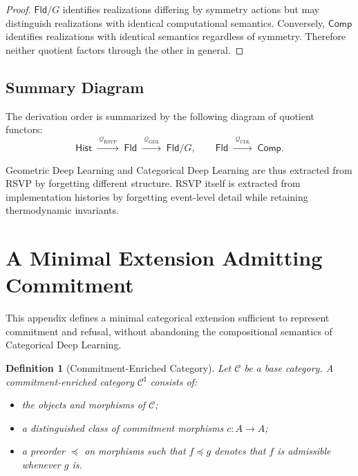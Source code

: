 \documentclass[11pt]{article}
\newtheorem{definition}{Definition}
\begin{document}
\begin{proof}
$\mathsf{Fld}/G$ identifies realizations differing by symmetry actions but may
distinguish realizations with identical computational semantics.
Conversely, $\mathsf{Comp}$ identifies realizations with identical semantics
regardless of symmetry. Therefore neither quotient factors through the other in
general.
\end{proof}

\subsection{Summary Diagram}

The derivation order is summarized by the following diagram of quotient functors:
\[
\mathsf{Hist}
\;\xrightarrow{\ \mathcal{Q}_{\mathrm{RSVP}}\ }\;
\mathsf{Fld}
\;\xrightarrow{\ \mathcal{Q}_{\mathrm{GDL}}\ }\;
\mathsf{Fld}/G,
\qquad
\mathsf{Fld}
\;\xrightarrow{\ \mathcal{Q}_{\mathrm{CDL}}\ }\;
\mathsf{Comp}.
\]

Geometric Deep Learning and Categorical Deep Learning are thus extracted from RSVP
by forgetting different structure. RSVP itself is extracted from implementation
histories by forgetting event-level detail while retaining thermodynamic
invariants.

\section{A Minimal Extension Admitting Commitment}

This appendix defines a minimal categorical extension sufficient to represent
commitment and refusal, without abandoning the compositional semantics of
Categorical Deep Learning.

\begin{definition}[Commitment-Enriched Category]
Let $\mathcal{C}$ be a base category. A \emph{commitment-enriched category}
$\mathcal{C}^\sharp$ consists of:
\begin{itemize}
\item the objects and morphisms of $\mathcal{C}$;
\item a distinguished class of \emph{commitment morphisms}
      $c : A \to A$;
\item a preorder $\preceq$ on morphisms such that
      $f \preceq g$ denotes that $f$ is admissible whenever $g$ is.
\end{itemize}
\end{definition}
\end{document}
